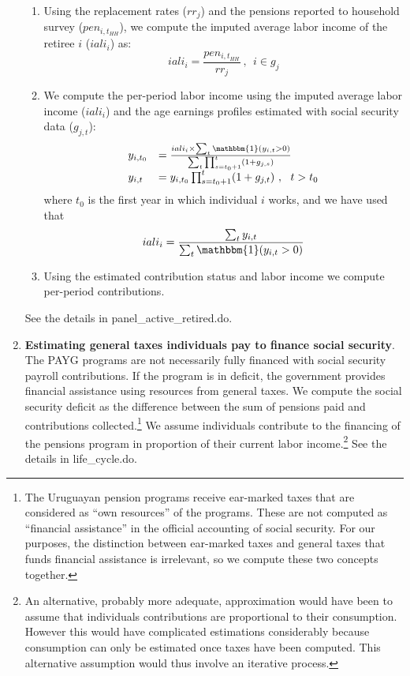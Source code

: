 \documentclass{article}
\begin{document}
\begin{enumerate}
\begin{enumerate}
    \item Using the replacement rates ($rr_j$) and the pensions reported to household survey ($pen_{i,t_{HH}}$), we compute the imputed average labor income  of the retiree $i$ ($iali_i$) as:
    \begin{equation} \label{eq:iali}
        iali_i = \frac{pen_{i,t_{HH}}}{rr_j} \ , \ \ i \in g_j 
    \end{equation}
    \item We compute the per-period labor income using the imputed average labor income ($iali_i$) and the age earnings profiles estimated with social security data ($g_{j,t}$):
     \begin{equation} \label{eq:liprofile}
     \begin{array}{ll}
          y_{i,t_0} &= \frac{iali_i \times \sum_t \mathbbm{1}(y_{i,t}>0) }{\sum_t \prod_{s=t_0+1}^t  (1+ g_{j,s})} \\
           y_{i,t}  &=  y_{i,t_0} \prod_{s=t_0+1}^t (1+ g_{j,t}) \ , \ \ t > t_0  
     \end{array}
    \end{equation}
    where $t_0$ is the first year in which individual $i$ works, and we have used that 
    \begin{equation} 
             iali_i  = \frac{\sum_t  y_{i,t}}{\sum_t \mathbbm{1}(y_{i,t}>0)}   
    \end{equation}
 
   
    \item Using the estimated contribution status and labor income we compute per-period contributions. 
\end{enumerate}
    See the details in panel\_active\_retired.do.
    
    \item \textbf{Estimating general taxes individuals pay to finance social security}\label{Estimating_taxes}. The PAYG programs are not necessarily fully financed with social security payroll contributions. If the program is in deficit, the government provides financial assistance using resources from general taxes. We compute the social security deficit as the difference between the sum of pensions paid and contributions collected.\footnote{The Uruguayan pension programs receive ear-marked taxes that are considered as ``own resources'' of the programs. These are not computed as ``financial assistance'' in the official accounting of social security. For our purposes, the distinction between ear-marked taxes and general taxes that funds financial assistance is irrelevant, so we compute these two concepts together.} We assume individuals contribute to the financing of the pensions program in proportion of their current labor income.\footnote{An alternative, probably more adequate, approximation would have been to assume that individuals contributions are proportional to their consumption. However this would have complicated estimations considerably because consumption can only be estimated once taxes have been computed. This alternative assumption would thus involve an iterative process.  } See the details in life\_cycle.do.
    

\end{enumerate}
\end{document}
